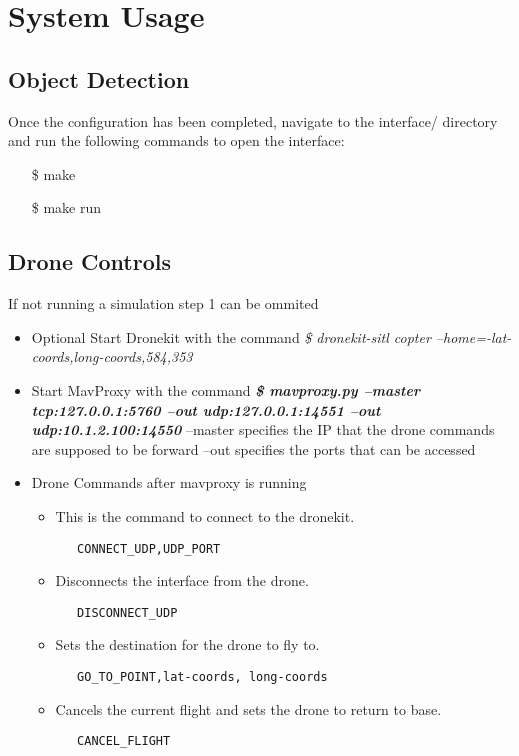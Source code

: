 \chapter{System Usage}
\section{Object Detection}

Once the configuration has been completed, navigate to the interface/ directory and run the following commands to open the interface:
\begin{itemize}
    \item[\$] make
    \item[\$] make run
\end{itemize}

\section{Drone Controls}
If not running a simulation step 1 can be ommited
\begin{itemize}
    \item {Optional} Start Dronekit with the command 
        \newline\textit{\$ dronekit-sitl copter --home=-lat-coords,long-coords,584,353}
    \item Start MavProxy with the command 
        \newline \textbf{\textit{\$ mavproxy.py --master tcp:127.0.0.1:5760 --out udp:127.0.0.1:14551 --out udp:10.1.2.100:14550}}
        \newline --master specifies the IP that the drone commands are supposed to be forward
        \newline --out specifies the ports that can be accessed 
    \item Drone Commands after mavproxy is running
    \begin{itemize}
        \item This is the command to connect to the dronekit.
        \item [] \begin{verbatim}   CONNECT_UDP,UDP_PORT\end{verbatim} 
        \item Disconnects the interface from the drone.
        \item [] \begin{verbatim}   DISCONNECT_UDP\end{verbatim}
        \item Sets the destination for the drone to fly to.
        \item [] \begin{verbatim}   GO_TO_POINT,lat-coords, long-coords\end{verbatim}
        \item Cancels the current flight and sets the drone to return to base.
        \item [] \begin{verbatim}   CANCEL_FLIGHT\end{verbatim}
     \end{itemize}
\end{itemize}